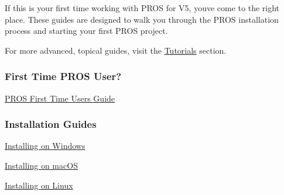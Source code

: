 If this is your first time working with P\+R\+OS for V5, you\textquotesingle{}ve come to the right place. These guides are designed to walk you through the P\+R\+OS installation process and starting your first P\+R\+OS project.

For more advanced, topical guides, visit the \hyperlink{md_docs_tutorials_index}{Tutorials} section.

\subsubsection*{First Time P\+R\+OS User?}


\begin{DoxyItemize}
\item \hyperlink{md_docs_getting-started_new-users}{P\+R\+OS First Time Users Guide}
\end{DoxyItemize}

\subsubsection*{Installation Guides}


\begin{DoxyItemize}
\item \hyperlink{md_docs_getting-started_windows}{Installing on Windows}
\item \hyperlink{md_docs_getting-started_macos}{Installing on mac\+OS}
\item \hyperlink{md_docs_getting-started_linux}{Installing on Linux} 
\end{DoxyItemize}